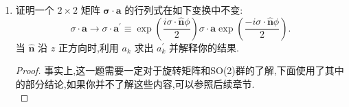 \begin{enumerate}
\begin{enumerate}
\begin{proof}
\begin{equation}
			\end{equation}
			其中我们知道$\mathrm{Tr}(A+B)=\mathrm{Tr}(A)+\mathrm{Tr}(B)$,而且我们不需要理会后面那一项,因为我们知道泡利矩阵的迹为$0$,不要忘记单位矩阵的迹是$2$,自然得出结果.\\
			下面我们看后面部分
			\begin{equation}
				\mathrm{Tr}(\sigma_{k}X)=a_{0}\mathrm{Tr}(\sigma_{k})+\sum_{\ell}\mathrm{Tr}(\sigma_{k}\sigma_{\ell})a_{\ell}=\frac{1}{2}\sum_{\ell}\mathrm{Tr}(\sigma_{k}\sigma_{\ell}+\sigma_{\ell}\sigma_{k})a_{\ell}
			\end{equation}
			其中$a_{0}\mathrm{Tr}(\sigma_{k})$这一项同样为$0$,后一项我们利用了迹的循环性质(泡利矩阵为$2\times2$的方阵):$\mathrm{Tr}(ABCD)=\mathrm{Tr}(BCDA)=\mathrm{Tr}(CDAB)$,并且注意到可以利用克罗内克符号将其表现为
			\begin{equation}
				\frac{1}{2}\sum_{\ell}\mathrm{Tr}(\sigma_{k}\sigma_{\ell}+\sigma_{\ell}\sigma_{k})a_{\ell}=\sum_{\ell}\delta_{k\ell}\mathrm{Tr}(\textbf{1})a_{\ell}=2a_{k}
			\end{equation}
			注意$\frac12$被约去了,且我们知道$\sum_{\ell}\delta_{k\ell}$具有筛选性质(参照附录),现在我们一并给出最终结果.
			\begin{equation}
				a_{0}=\frac{1}{2}\mathrm{Tr}(X)\text{和}a_{k}=\frac{1}{2}\mathrm{Tr}(\sigma_{k}X)
			\end{equation}
		\end{proof}
		\item 利用矩阵元 ${X}_{ij}$ 求出 ${a}_{0}$ 和 ${a}_{k}$.
		\begin{proof}
			直接写为矩阵元形式带入即可得到答案
			\begin{equation}
				a_{0}=(X_{11}+X_{22})/2,a_{1}=(X_{12}+X_{21})/2, a_{2}=i(-X_{21}+X_{12})/2,a_{3}=(X_{11}-X_{22})/2
			\end{equation}
		\end{proof}
	\end{enumerate}
	\item 证明一个 $2 \times 2$ 矩阵 $\mathbf{\sigma } \cdot \mathbf{a}$ 的行列式在如下变换中不变:
	$$
	\sigma \cdot \mathbf{a} \rightarrow \sigma \cdot {\mathbf{a}}^{\prime } \equiv \exp \left( \frac{{i\sigma } \cdot \widehat{\mathbf{n}}\phi }{2}\right) \sigma \cdot \textbf{a}\operatorname{exp}\left( \frac{-{i\sigma } \cdot \widehat{\mathbf{n}}\phi }{2}\right) .
	$$
	当 $\widehat{\mathbf{n}}$ 沿 $z$ 正方向时,利用 ${a}_{k}$ 求出 ${a}_{k}^{\prime }$ 并解释你的结果.
	\begin{proof}
		事实上,这一题需要一定对于旋转矩阵和SO(2)群的了解,下面使用了其中的部分结论,如果你并不了解这些内容,可以参照后续章节.\\

\end{proof}
\end{enumerate}
